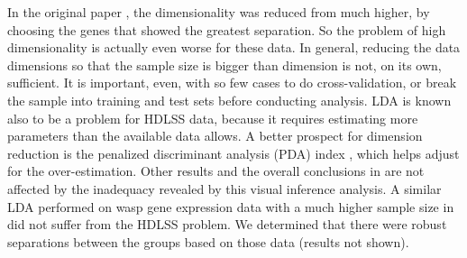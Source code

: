 In the original paper \citep{toth:2010}, the dimensionality was reduced from much higher, by choosing the genes that showed the greatest separation. So the problem of high dimensionality is actually even worse for these data. In general, reducing the data dimensions so that the sample size is bigger than dimension is not, on its own, sufficient. It is important, even, with so few cases to do cross-validation, or break the sample into training and test sets before conducting analysis. LDA is known also to be a problem for HDLSS data, because it requires estimating more parameters than the available data allows. A better prospect for dimension reduction is the penalized discriminant analysis (PDA) index \citep{lee:2009}, which helps adjust for the over-estimation. Other results and the overall conclusions in \cite{toth:2010} are not affected by the inadequacy revealed by this visual inference analysis. A similar LDA performed on wasp gene expression data with a much higher sample size in \cite{toth:2007} did not suffer from the HDLSS problem. We determined that there were robust separations between the groups based on those data (results not shown).






